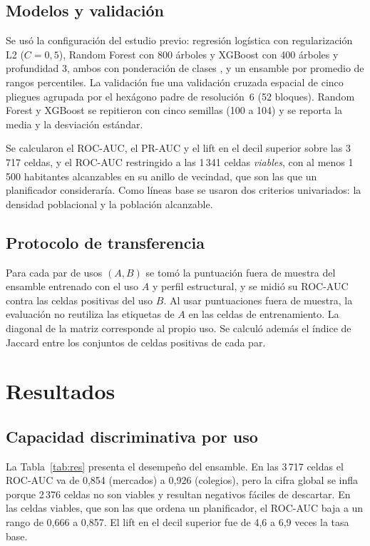 \documentclass[10pt,letterpaper,twocolumn]{article}
\begin{document}
\subsection{Modelos y validación}

Se usó la configuración del estudio previo: regresión logística con regularización L2 ($C=0{,}5$), Random Forest \citep{breiman2001} con 800 árboles y XGBoost \citep{chen2016} con 400 árboles y profundidad 3, ambos con ponderación de clases \citep{he2009}, y un ensamble por promedio de rangos percentiles. La validación fue una validación cruzada espacial de cinco pliegues agrupada por el hexágono padre de resolución~6 (52 bloques). Random Forest y XGBoost se repitieron con cinco semillas (100 a 104) y se reporta la media y la desviación estándar.

Se calcularon el ROC-AUC, el PR-AUC y el lift en el decil superior sobre las 3\,717 celdas, y el ROC-AUC restringido a las 1\,341 celdas \textit{viables}, con al menos 1\,500 habitantes alcanzables en su anillo de vecindad, que son las que un planificador consideraría. Como líneas base se usaron dos criterios univariados: la densidad poblacional y la población alcanzable.

\subsection{Protocolo de transferencia}

Para cada par de usos $(A,B)$ se tomó la puntuación fuera de muestra del ensamble entrenado con el uso $A$ y perfil estructural, y se midió su ROC-AUC contra las celdas positivas del uso $B$. Al usar puntuaciones fuera de muestra, la evaluación no reutiliza las etiquetas de $A$ en las celdas de entrenamiento. La diagonal de la matriz corresponde al propio uso. Se calculó además el índice de Jaccard entre los conjuntos de celdas positivas de cada par.

\section{Resultados}

\subsection{Capacidad discriminativa por uso}

La Tabla~\ref{tab:res} presenta el desempeño del ensamble. En las 3\,717 celdas el ROC-AUC va de 0,854 (mercados) a 0,926 (colegios), pero la cifra global se infla porque 2\,376 celdas no son viables y resultan negativos fáciles de descartar. En las celdas viables, que son las que ordena un planificador, el ROC-AUC baja a un rango de 0,666 a 0,857. El lift en el decil superior fue de 4,6 a 6,9 veces la tasa base.
\end{document}
